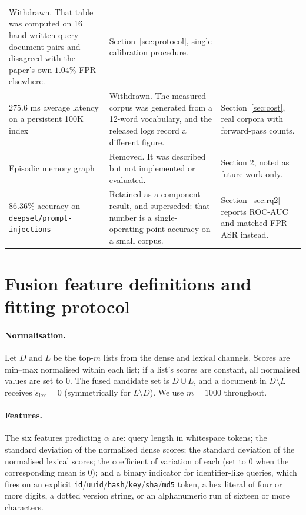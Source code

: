 \documentclass{article}
\begin{document}
\begin{table}[h]
\begin{tabular}{p{}p{}p{}}
Withdrawn. That table was computed on 16 hand-written query--document pairs and
disagreed with the paper's own $1.04\%$ FPR elsewhere. &
Section~\ref{sec:protocol}, single calibration procedure. \\
\addlinespace
$275.6$ ms average latency on a persistent 100K index &
Withdrawn. The measured corpus was generated from a 12-word vocabulary, and the
released logs record a different figure. &
Section~\ref{sec:cost}, real corpora with forward-pass counts. \\
\addlinespace
Episodic memory graph &
Removed. It was described but not implemented or evaluated. &
Section 2, noted as future work only. \\
\addlinespace
$86.36\%$ accuracy on \texttt{deepset/prompt-injections} &
Retained as a component result, and superseded: that number is a
single-operating-point accuracy on a small corpus. &
Section~\ref{sec:rq2} reports ROC-AUC and matched-FPR ASR instead. \\
\bottomrule
\end{tabular}
\end{table}

\section{Fusion feature definitions and fitting protocol}
\label{app:features}

\paragraph{Normalisation.} Let $D$ and $L$ be the top-$m$ lists from the dense
and lexical channels. Scores are min--max normalised within each list; if a
list's scores are constant, all normalised values are set to $0$. The fused
candidate set is $D \cup L$, and a document in $D \setminus L$ receives
$\tilde{s}_{\text{lex}} = 0$ (symmetrically for $L \setminus D$). We use
$m = 1000$ throughout.

\paragraph{Features.} The six features predicting $\alpha$ are: query length in
whitespace tokens; the standard deviation of the normalised dense scores; the
standard deviation of the normalised lexical scores; the coefficient of
variation of each (set to $0$ when the corresponding mean is $0$); and a binary
indicator for identifier-like queries, which fires on an explicit
\texttt{id}/\texttt{uuid}/\texttt{hash}/\texttt{key}/\texttt{sha}/\texttt{md5}
token, a hex literal of four or more digits, a dotted version string, or an
alphanumeric run of sixteen or more characters.
\end{document}
